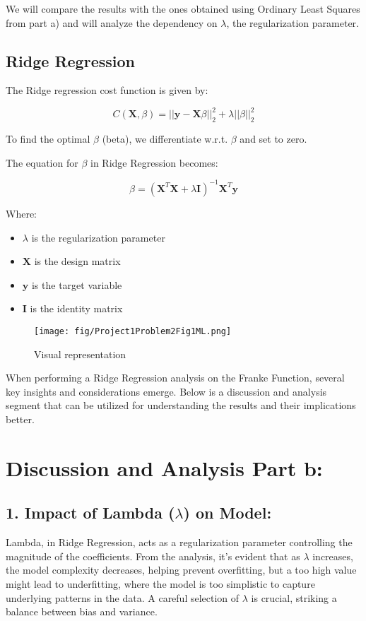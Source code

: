 \documentclass{article}
\begin{document}
We will compare the results with the ones obtained using Ordinary Least Squares from part a) and will analyze the dependency on \( \lambda \), the regularization parameter.

\subsection*{Ridge Regression}

The Ridge regression cost function is given by:

\[
C(\mathbf{X}, \beta) = ||\mathbf{y} - \mathbf{X}\beta||^2_2 + \lambda||\beta||^2_2
\]

To find the optimal \( \beta \) (beta), we differentiate w.r.t. \( \beta \) and set to zero.

The equation for \( \beta \) in Ridge Regression becomes:

\[
\beta = (\mathbf{X}^T \mathbf{X} + \lambda \mathbf{I})^{-1} \mathbf{X}^T \mathbf{y}
\]

Where:

\begin{itemize}
    \item \( \lambda \) is the regularization parameter
    \item \( \mathbf{X} \) is the design matrix
    \item \( \mathbf{y} \) is the target variable
    \item \( \mathbf{I} \) is the identity matrix
\end{itemize}

 \begin{figure}[htbp]
    \centering
    \texttt{[image: fig/Project1Problem2Fig1ML.png]}
    \caption{Visual representation}
    \label{fig:python-code}
\end{figure}

When performing a Ridge Regression analysis on the Franke Function, several key insights and considerations emerge. Below is a discussion and analysis segment that can be utilized for understanding the results and their implications better.



\section*{Discussion and Analysis Part b:}

\subsection*{1. Impact of Lambda ($\lambda$) on Model:}
Lambda, in Ridge Regression, acts as a regularization parameter controlling the magnitude of the coefficients. From the analysis, it's evident that as $\lambda$ increases, the model complexity decreases, helping prevent overfitting, but a too high value might lead to underfitting, where the model is too simplistic to capture underlying patterns in the data. A careful selection of $\lambda$ is crucial, striking a balance between bias and variance.
\end{document}
